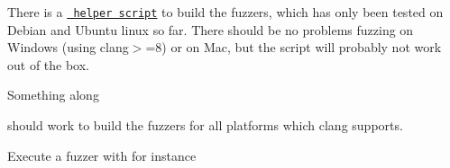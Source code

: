 There is a \href{build.sh}{\texttt{ helper script}} to build the fuzzers, which has only been tested on Debian and Ubuntu linux so far. There should be no problems fuzzing on Windows (using clang\texorpdfstring{$>$}{>}=8) or on Mac, but the script will probably not work out of the box.

Something along 
\begin{DoxyCode}{0}

\end{DoxyCode}
 should work to build the fuzzers for all platforms which clang supports.

Execute a fuzzer with for instance 
\begin{DoxyCode}{0}

\end{DoxyCode}
 